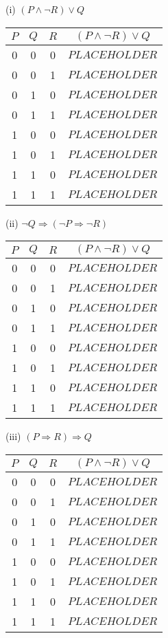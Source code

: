 \documentclass{article}
\begin{document}
(i) $(P \land \neg R) \lor Q$\\
\begin{tabular}{|c|c|c|c|}
    \hline
    $P$ & $Q$ & $R$ & $(P \land \neg R) \lor Q$ \\
    \hline
    0   & 0   & 0   & $PLACEHOLDER$             \\
    0   & 0   & 1   & $PLACEHOLDER$             \\
    0   & 1   & 0   & $PLACEHOLDER$             \\
    0   & 1   & 1   & $PLACEHOLDER$             \\
    1   & 0   & 0   & $PLACEHOLDER$             \\
    1   & 0   & 1   & $PLACEHOLDER$             \\
    1   & 1   & 0   & $PLACEHOLDER$             \\
    1   & 1   & 1   & $PLACEHOLDER$             \\
    \hline
\end{tabular}

(ii) $\neg Q \Rightarrow (\neg P \Rightarrow \neg R)$\\
\begin{tabular}{|c|c|c|c|}
    \hline
    $P$ & $Q$ & $R$ & $(P \land \neg R) \lor Q$ \\
    \hline
    0   & 0   & 0   & $PLACEHOLDER$             \\
    0   & 0   & 1   & $PLACEHOLDER$             \\
    0   & 1   & 0   & $PLACEHOLDER$             \\
    0   & 1   & 1   & $PLACEHOLDER$             \\
    1   & 0   & 0   & $PLACEHOLDER$             \\
    1   & 0   & 1   & $PLACEHOLDER$             \\
    1   & 1   & 0   & $PLACEHOLDER$             \\
    1   & 1   & 1   & $PLACEHOLDER$             \\
    \hline
\end{tabular}

(iii) $(P \Rightarrow R) \Rightarrow Q$\\
\begin{tabular}{|c|c|c|c|}
    \hline
    $P$ & $Q$ & $R$ & $(P \land \neg R) \lor Q$ \\
    \hline
    0   & 0   & 0   & $PLACEHOLDER$             \\
    0   & 0   & 1   & $PLACEHOLDER$             \\
    0   & 1   & 0   & $PLACEHOLDER$             \\
    0   & 1   & 1   & $PLACEHOLDER$             \\
    1   & 0   & 0   & $PLACEHOLDER$             \\
    1   & 0   & 1   & $PLACEHOLDER$             \\
    1   & 1   & 0   & $PLACEHOLDER$             \\
    1   & 1   & 1   & $PLACEHOLDER$             \\
    \hline
\end{tabular}
\end{document}

